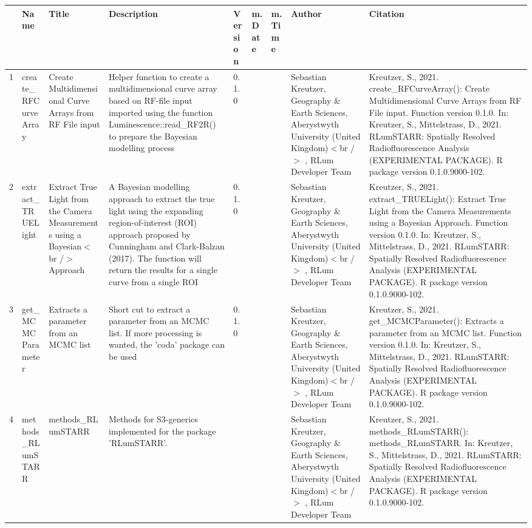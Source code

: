 \begin{table}[ht]
\centering
\begin{tabular}{rllllllll}
  \hline
 & Name & Title & Description & Version & m.Date & m.Time & Author & Citation \\ 
  \hline
1 & create\_RFCurveArray & Create Multidimensional Curve Arrays from RF File input & Helper function to create a multidimensional curve array based on RF-file input imported using the function  Luminescence::read\_RF2R()  to prepare the Bayesian modelling process & 0.1.0
 &  &  & Sebastian Kreutzer, Geography \& Earth Sciences, Aberystwyth University (United Kingdom)$<$br /$>$ , RLum Developer Team & Kreutzer, S., 2021. create\_RFCurveArray(): Create Multidimensional Curve Arrays from RF File input. Function version 0.1.0. In: Kreutzer, S., Mittelstrass, D., 2021. RLumSTARR: Spatially Resolved Radiofluorescence Analysis (EXPERIMENTAL PACKAGE). R package version 0.1.0.9000-102. 
 \\ 
  2 & extract\_TRUELight & Extract True Light from the Camera Measurements using a Bayesian$<$br /$>$ Approach & A Bayesian modelling approach to extract the true light using the expanding region-of-interest (ROI) approach proposed by Cunningham and Clark-Balzan (2017). The function will return the results for a  single  curve from a  single  ROI & 0.1.0
 &  &  & Sebastian Kreutzer, Geography \& Earth Sciences, Aberystwyth University (United Kingdom)$<$br /$>$ , RLum Developer Team & Kreutzer, S., 2021. extract\_TRUELight(): Extract True Light from the Camera Measurements using a Bayesian Approach. Function version 0.1.0. In: Kreutzer, S., Mittelstrass, D., 2021. RLumSTARR: Spatially Resolved Radiofluorescence Analysis (EXPERIMENTAL PACKAGE). R package version 0.1.0.9000-102. 
 \\ 
  3 & get\_MCMCParameter & Extracts a parameter from an MCMC list & Short cut to extract a parameter from an MCMC list. If more processing is wanted, the  'coda'  package can be used & 0.1.0
 &  &  & Sebastian Kreutzer, Geography \& Earth Sciences, Aberystwyth University (United Kingdom)$<$br /$>$ , RLum Developer Team & Kreutzer, S., 2021. get\_MCMCParameter(): Extracts a parameter from an MCMC list. Function version 0.1.0. In: Kreutzer, S., Mittelstrass, D., 2021. RLumSTARR: Spatially Resolved Radiofluorescence Analysis (EXPERIMENTAL PACKAGE). R package version 0.1.0.9000-102. 
 \\ 
  4 & methods\_RLumSTARR & methods\_RLumSTARR & Methods for S3-generics implemented for the package 'RLumSTARR'. &  &  &  & Sebastian Kreutzer, Geography \& Earth Sciences, Aberystwyth University (United Kingdom)$<$br /$>$ , RLum Developer Team & Kreutzer, S., 2021. methods\_RLumSTARR(): methods\_RLumSTARR. In: Kreutzer, S., Mittelstrass, D., 2021. RLumSTARR: Spatially Resolved Radiofluorescence Analysis (EXPERIMENTAL PACKAGE). R package version 0.1.0.9000-102. 

\end{tabular}
\end{table}
